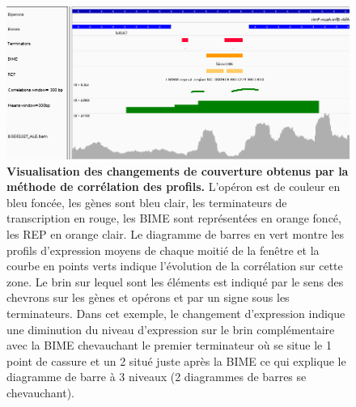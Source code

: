 \documentclass[12pt,a4paper]{report}
\begin{document}
\begin{onehalfspace}
\begin{figure}[!h]
\centerline{\includegraphics[scale=0.55]{figures/igv_profil.png}}
\caption{\textbf{Visualisation des changements de couverture obtenus par la méthode de corrélation des profils.} L'opéron est de couleur en bleu foncée, les gènes sont bleu clair, les terminateurs de transcription en rouge, les BIME sont représentées en orange foncé, les REP en orange clair. Le diagramme de barres en vert montre les profils d'expression moyens de chaque moitié de la fenêtre et la courbe en points verts indique l'évolution de la corrélation sur cette zone. Le brin sur lequel sont les éléments est indiqué par le sens des chevrons sur les gènes et opérons et par un signe sous les terminateurs. Dans cet exemple, le changement d'expression indique une diminution du niveau d'expression sur le brin complémentaire avec la BIME chevauchant le premier terminateur où se situe le 1 point de cassure et un 2 situé juste après la BIME ce qui explique le diagramme de barre à 3 niveaux (2 diagrammes de barres se chevauchant).}
\label{fig:igv_profil}
\end{figure}


\end{onehalfspace}
\end{document}
